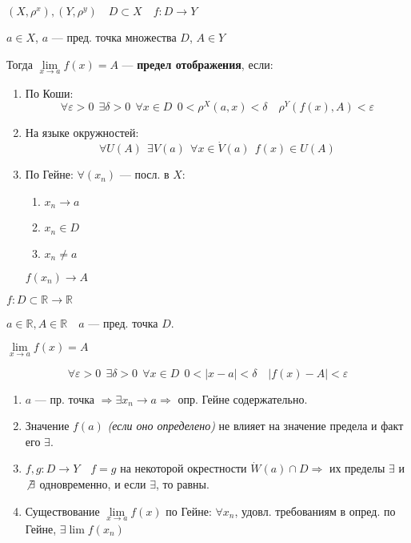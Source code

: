 \begin{definition}
    $(X, \rho^x), (Y, \rho^y) \quad D\subset X \quad f:D\to Y$

    $a\in X$, $a$ --- пред. точка множества $D$, $A\in Y$

    Тогда $\lim\limits_{x\to a}f(x)=A$ --- \textbf{предел отображения}, если:
    \begin{enumerate}
    \item По Коши:
    $$\forall \varepsilon>0 \ \ \exists \delta>0 \ \ \forall x\in D \ \ 0<\rho^X(a,x)<\delta \quad \rho^Y(f(x), A) < \varepsilon$$
    \item На языке окружностей:
    $$\forall U(A) \ \ \exists V(a) \ \ \forall x\in \dot V(a) \ \ f(x)\in U(A)$$
    \item По Гейне: $\forall (x_n)$ --- посл. в $X$:
    \begin{enumerate}
        \item $x_n\to a$
        \item $x_n\in D$
        \item $x_n\not = a$
    \end{enumerate}
    $f(x_n)\to A$
    \end{enumerate}
\end{definition}

\begin{consequence}
    $f:D\subset\mathbb{R} \to \mathbb{R}$
    
    $a\in\mathbb{R}, A\in\mathbb{R} \quad a$ --- пред. точка $D$.

    $\lim\limits_{x\to a} f(x)=A$

    $$\forall \varepsilon > 0 \ \ \exists \delta>0 \ \ \forall x\in D \ \ 0<|x-a|<\delta \quad |f(x)-A|<\varepsilon$$
\end{consequence}

\begin{remark}
    \begin{enumerate}
        \item $a$ --- пр. точка $\Rightarrow \exists x_n\to a \Rightarrow$ опр. Гейне содержательно.
        \item Значение $f(a)$ \textit{(если оно определено)} не влияет на значение предела и факт его $\exists$.
        \item $f,g:D\to Y \quad f=g$ на некоторой окрестности $\dot W(a)\cap D \Rightarrow$ их пределы $\exists$ и $\not \exists$ одновременно, и если $\exists$, то равны.
        \item Существование $\lim\limits_{x\to a} f(x)$ по Гейне: $\forall x_n$, удовл. требованиям в опред. по Гейне, $\exists\lim f(x_n)$
    \end{enumerate}
\end{remark}

